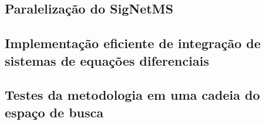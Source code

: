 \documentclass[12pt]{article}
\begin{document}
\subsection{Paralelização do SigNetMS}

\subsection{Implementação eficiente de integração de sistemas de
equações diferenciais}

\subsection{Testes da metodologia em uma cadeia do espaço de busca}





 

\end{document}
